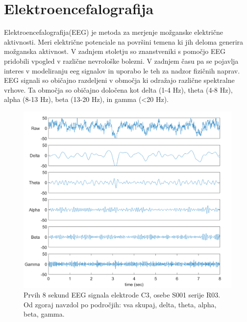 \section{Elektroencefalografija}
Elektroencefalografija(EEG) je metoda za merjenje možganske električne aktivnosti. Meri električne potenciale na površini temena ki jih deloma generira možganska aktivnost. V zadnjem stoletju so znanstveniki s pomočjo EEG pridobili vpogled v različne nevrološke bolezni. V zadnjem času pa se pojavlja interes v modeliranju eeg signalov in uporabo le teh za nadzor fizičnih naprav. EEG signali so običajno razdeljeni v območja ki odražajo različne spektralne vrhove. Ta območja so običajno določena kot delta (1-4 Hz), theta (4-8 Hz), alpha (8-13 Hz), beta (13-20 Hz), in gamma (<20 Hz). 
 \cite{nunezElectroencephalographyEEGNeurophysics2016}
 \begin{figure}[h!]
    \begin{center}
    \includegraphics[width=1\linewidth]{slike/EEGSignals.png}
    \end{center}
    \caption{Prvih 8 sekund EEG signala elektrode C3, osebe S001 serije R03. Od zgoraj navzdol po področjih: vsa skupaj, delta, theta, alpha, beta, gamma.}
    \end{figure}


